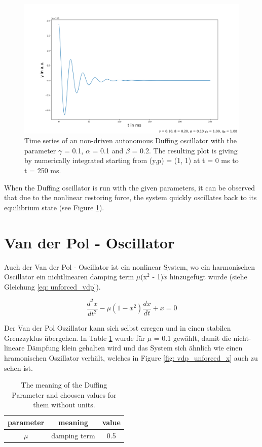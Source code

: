\documentclass[oneside,10pt,a4paper]{report}
\begin{document}
		
		\begin{figure}[H]
			\centering
			\includegraphics[scale=0.4]{duffing_unforced_y.png}
			\caption{Time series of an non-driven autonomous Duffing oscillator with the parameter $\gamma$ = 0.1, $\alpha$ = 0.1 and $\beta$ = 0.2. The resulting plot is giving by numerically integrated starting from (y,p) = (1, 1) at t = 0 ms to t = 250 ms.}
			\label{fig: duffing_unforced_y}
		\end{figure}
		
		When the Duffing oscillator is run with the given parameters, it can be observed that due to the nonlinear restoring force, the system quickly oscillates back to its equilibrium state (see Figure \ref{fig: duffing_unforced_y}).
	
	
		\section{Van der Pol - Oscillator}
		Auch der Van der Pol - Oscillator ist ein nonlinear System, wo ein harmonischen Oscillator ein nichtlinearen damping term $\mu$(x$^2$ - 1)$\dot{x}$ hinzugefügt wurde (siehe Gleichung \ref{eq: unforced_vdp}).
		
		\begin{equation}\label{eq: unforced_vdp}
			\frac{d^2x}{dt^2} - \mu (1 - x^2) \frac{dx}{dt} + x = 0
		\end{equation}
		
		Der Van der Pol Oszillator kann sich selbst erregen und in einen stabilen Grenzzyklus übergehen. 
		In Table \ref{tab: vdp_ungetriebene_parameter} wurde für $\mu$ = 0.1 gewählt, damit die nicht-lineare Dämpfung klein gehalten wird und das System sich ähnlich wie einen hramonischen Oszillator verhält, welches in Figure \ref*{fig: vdp_unforced_x} auch zu sehen ist.
			\begin{table}[H]
			\centering
			\caption{The meaning of the Duffing Parameter and choosen values for them without units.}
			\label{tab: vdp_ungetriebene_parameter}
			\begin{tabular}{c c c}
				\toprule
				parameter & meaning & value\\
				\midrule
				$\mu$ & damping term & 0.5\\
				\bottomrule
			\end{tabular}
		\end{table}
		
\end{document}
